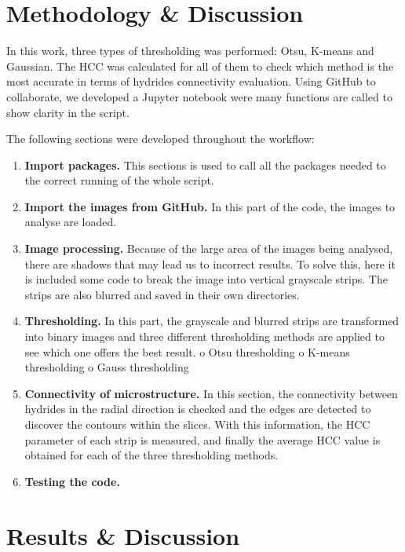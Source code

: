 \section{Methodology \& Discussion}

In this work, three types of thresholding was performed: Otsu, K-means and Gaussian. The HCC was calculated for all of them to check which method is the most accurate in terms of hydrides connectivity evaluation. Using GitHub to collaborate, we developed a Jupyter notebook were many functions are called to show clarity in the script.

The following sections were developed throughout the workflow:

\begin{enumerate}

    \item \textbf{Import packages.}
This sections is used to call all the packages needed to the correct running of the whole script.

    \item\textbf{ Import the images from GitHub.}
In this part of the code, the images to analyse are loaded.

    \item \textbf{Image processing.}
Because of the large area of the images being analysed, there are shadows that may lead us to incorrect results. To solve this, here it is included some code to break the image into vertical grayscale strips. The strips are also blurred and saved in their own directories.

    \item \textbf{Thresholding.}
In this part, the grayscale and blurred strips are transformed into binary images and three different thresholding methods are applied to see which one offers the best result.
o	Otsu thresholding
o	K-means thresholding
o	Gauss thresholding

    \item \textbf{Connectivity of microstructure.}
In this section, the connectivity between hydrides in the radial direction is checked and the edges are detected to discover the contours within the slices. With this information, the HCC parameter of each strip is measured, and finally the average HCC value is obtained for each of the three thresholding methods.

    \item \textbf{Testing the code.}


\end{enumerate}

\section{Results \& Discussion}
